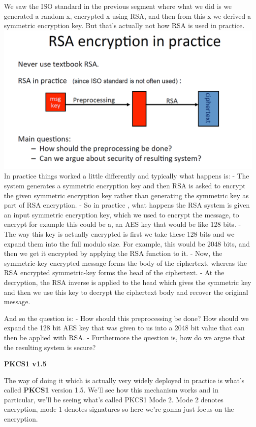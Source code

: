 \documentclass[11pt]{article}
\makeatletter
\def\maxwidth{\ifdim\Gin@nat@width>\linewidth\linewidth
    \else\Gin@nat@width\fi}
\let\Oldincludegraphics\includegraphics
\renewcommand{\includegraphics}[1]{\Oldincludegraphics[width=.8\maxwidth]{#1}}
\makeatother
\begin{document}
We saw the ISO standard in the previous segment where what we did is we
generated a random x, encrypted x using RSA, and then from this x we
derived a symmetric encryption key. But that's actually not how RSA is
used in practice. \includegraphics{./Images/RSA-InPractice.png} In
practice things worked a little differently and typically what happens
is: - The system generates a symmetric encryption key and then RSA is
asked to encrypt the given symmetric encryption key rather than
generating the symmetric key as part of RSA encryption. - So in practice
, what happens the RSA system is given an input symmetric encryption
key, which we used to encrypt the message, to encrypt for example this
could be a, an AES key that would be like 128 bits. - The way this key
is actually encrypted is first we take these 128 bits and we expand them
into the full modulo size. For example, this would be 2048 bits, and
then we get it encrypted by applying the RSA function to it. - Now, the
symmetric-key encrypted message forms the body of the ciphertext,
whereas the RSA encrypted symmetric-key forms the head of the
ciphertext. - At the decryption, the RSA inverse is applied to the head
which gives the symmetric key and then we use this key to decrypt the
ciphertext body and recover the original message.

And so the question is: - How should this preprocessing be done? How
should we expand the 128 bit AES key that was given to us into a 2048
bit value that can then be applied with RSA. - Furthermore the question
is, how do we argue that the resulting system is secure?

\textbf{PKCS1 v1.5}

The way of doing it which is actually very widely deployed in practice
is what's called \textbf{PKCS1} version 1.5. We'll see how this
mechanism works and in particular, we'll be seeing what's called PKCS1
Mode 2. Mode 2 denotes encryption, mode 1 denotes signatures so here
we're gonna just focus on the encryption.
\end{document}
